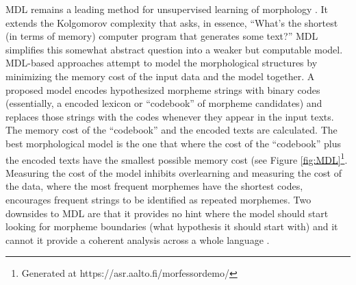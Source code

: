 \documentclass[12pt]{article}
\begin{document}
MDL remains a leading method for unsupervised learning of morphology \cite{hammarstrom_unsupervised_2011}. It extends the Kolgomorov complexity that asks, in essence, ``What's the shortest (in terms of memory) computer program that generates some text?'' MDL simplifies this somewhat abstract question into a weaker but computable model. MDL-based approaches attempt to model the morphological structures by minimizing the memory cost of the input data and the model together. A proposed model encodes hypothesized morpheme strings with binary codes (essentially, a encoded lexicon or ``codebook'' of morpheme candidates) and replaces those strings with the codes whenever they appear in the input texts. The memory cost of the ``codebook'' and the encoded texts are calculated. The best morphological model is the one that where the cost of the ``codebook'' plus the encoded texts have the smallest possible memory cost (see Figure \ref{fig:MDL}\footnote{Generated at https://asr.aalto.fi/morfessordemo/}. Measuring the cost of the model inhibits overlearning and measuring the cost of the data, where the most frequent morphemes have the shortest codes, encourages frequent strings to be identified as repeated morphemes. Two downsides to MDL are that it provides no hint where the model should start looking for morpheme boundaries (what hypothesis it should start with) and it cannot it provide a coherent analysis across a whole language \cite{goldsmith_computational_2017}.
\end{document}
